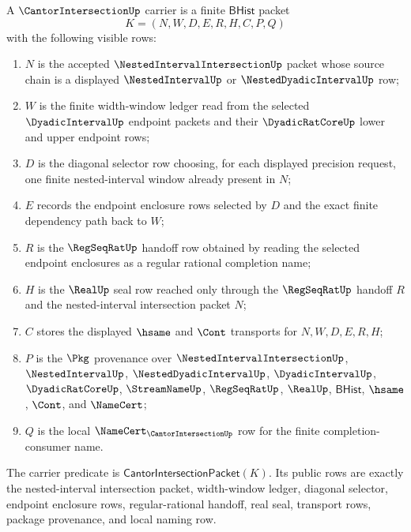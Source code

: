 \begin{definition}
\label{def:cantor-intersection-carrier}
A $\CantorIntersectionUp$ carrier is a finite $\mathsf{BHist}$ packet
$$
K=(N,W,D,E,R,H,C,P,Q)
$$
with the following visible rows:
\begin{enumerate}
\item $N$ is the accepted $\NestedIntervalIntersectionUp$ packet whose source chain is a displayed $\NestedIntervalUp$ or $\NestedDyadicIntervalUp$ row;
\item $W$ is the finite width-window ledger read from the selected $\DyadicIntervalUp$ endpoint packets and their $\DyadicRatCoreUp$ lower and upper endpoint rows;
\item $D$ is the diagonal selector row choosing, for each displayed precision request, one finite nested-interval window already present in $N$;
\item $E$ records the endpoint enclosure rows selected by $D$ and the exact finite dependency path back to $W$;
\item $R$ is the $\RegSeqRatUp$ handoff row obtained by reading the selected endpoint enclosures as a regular rational completion name;
\item $H$ is the $\RealUp$ seal row reached only through the $\RegSeqRatUp$ handoff $R$ and the nested-interval intersection packet $N$;
\item $C$ stores the displayed $\hsame$ and $\Cont$ transports for $N,W,D,E,R,H$;
\item $P$ is the $\Pkg$ provenance over $\NestedIntervalIntersectionUp$, $\NestedIntervalUp$, $\NestedDyadicIntervalUp$, $\DyadicIntervalUp$, $\DyadicRatCoreUp$, $\StreamNameUp$, $\RegSeqRatUp$, $\RealUp$, $\mathsf{BHist}$, $\hsame$, $\Cont$, and $\NameCert$;
\item $Q$ is the local $\NameCert_{\CantorIntersectionUp}$ row for the finite completion-consumer name.
\end{enumerate}
The carrier predicate is $\mathsf{CantorIntersectionPacket}(K)$. Its public rows are exactly the nested-interval intersection packet, width-window ledger, diagonal selector, endpoint enclosure rows, regular-rational handoff, real seal, transport rows, package provenance, and local naming row.
\end{definition}

